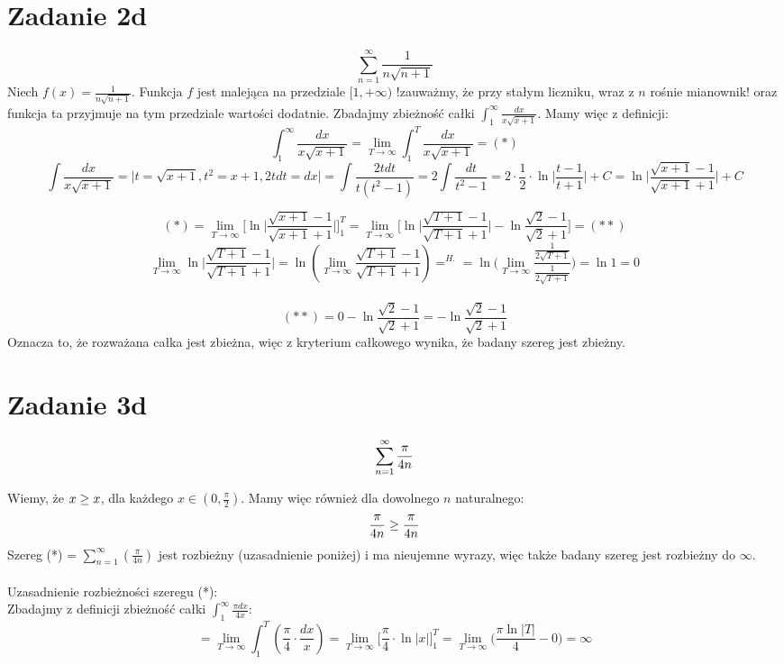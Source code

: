 \documentclass{article}
\let\tan\relax
\DeclareMathOperator{\tan}{tg}
\begin{document}

\section*{Zadanie 2d}

$$\sum_{n=1}^{\infty} \frac{1}{n \sqrt{n+1}}$$
Niech $f(x) = \frac{1}{n \sqrt{n+1}}$. Funkcja $f$ jest malejąca na przedziale $[1, +\infty)$ !zauważmy, że przy stałym liczniku, wraz z $n$ rośnie mianownik! oraz funkcja ta przyjmuje na tym przedziale wartości dodatnie. Zbadajmy zbieżność całki $\int_{1}^{\infty} \frac{dx}{x \sqrt{x+1}}$. Mamy więc z definicji:
$$\int_{1}^{\infty} \frac{dx}{x \sqrt{x+1}} = \lim_{T \to \infty} \int_{1}^{T} \frac{dx}{x \sqrt{x+1}} = (*)$$
$$\int \frac{dx}{x \sqrt{x+1}} = \Big| t = \sqrt{x+1}, t^2 = x+1, 2tdt = dx \Big| = \int \frac{2t dt}{t(t^2-1)} = 2 \int \frac{dt}{t^2 - 1} = 2 \cdot \frac{1}{2} \cdot \ln \Big|\frac{t-1}{t+1}\Big| + C = \ln \Big|\frac{\sqrt{x+1}-1}{\sqrt{x+1}+1}\Big|+C$$

$$(*) = \lim_{T \to \infty} \Big[ \ln \Big|\frac{\sqrt{x+1}-1}{\sqrt{x+1}+1}\Big|\Big]_{1}^{T} = \lim_{T \to \infty} \Big[ \ln \Big| \frac{\sqrt{T+1}-1}{\sqrt{T+1}+1} \Big| - \ln \frac{\sqrt{2}-1}{\sqrt{2}+1}\Big] = (**)$$
$$\lim_{T \to \infty} \ln \Big| \frac{\sqrt{T+1}-1}{\sqrt{T+1}+1} \Big| = \ln(\lim_{T \to \infty} \frac{\sqrt{T+1}-1}{\sqrt{T+1}+1}) =^{H.} = \ln \Big(\lim_{T \to \infty} \frac{\frac{1}{2\sqrt{T+1}}}{\frac{1}{2\sqrt{T+1}}}\Big) = \ln 1 = 0$$ \\
$$(**) = 0 - \ln \frac{\sqrt{2}-1}{\sqrt{2}+1} = - \ln \frac{\sqrt{2}-1}{\sqrt{2}+1}$$
Oznacza to, że rozważana całka jest zbieżna, więc z kryterium całkowego wynika, że badany szereg jest zbieżny.

\section*{Zadanie 3d}

$$\sum_{n=1}^{\infty} \tan{\frac{\pi}{4n}}$$

Wiemy, że $\tan{x} \geq x$, dla każdego $x \in (0, \frac{\pi}{2})$. Mamy więc również dla dowolnego $n$ naturalnego: 
$$\tan{\frac{\pi}{4n}} \geq \frac{\pi}{4n}$$
Szereg (*) = $\sum_{n=1}^{\infty} (\frac{\pi}{4n})$ jest rozbieżny (uzasadnienie poniżej) i ma nieujemne wyrazy, więc także badany szereg jest rozbieżny do $\infty$. \\ \\
Uzasadnienie rozbieżności szeregu (*): \\
Zbadajmy z definicji zbieżność całki $\int_{1}^{\infty} \frac{\pi dx}{4x}$:
$$= \lim_{T \to \infty} \int_{1}^{T} (\frac{\pi}{4} \cdot \frac{dx}{x}) = \lim_{T \to \infty} \Big[ \frac{\pi}{4} \cdot \ln |x| \Big]_{1}^{T} = \lim_{T \to \infty}\Big(\frac{\pi \ln |T|}{4} - 0 \Big) = \infty$$
\end{document}
